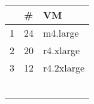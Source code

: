 {\scriptsize
\begin{tabular}{@{}lll@{}}
\toprule
     & \#     & VM         \\ \midrule
1    & 24     & m4.large  \\
2    & 20     & r4.xlarge   \\
3    & 12     & r4.2xlarge   \\
     &        &            \\
     &        &            \\
     &        &            \\
     &        &            \\
     &        &            \\
     &        &            \\ \bottomrule
\end{tabular}
}
